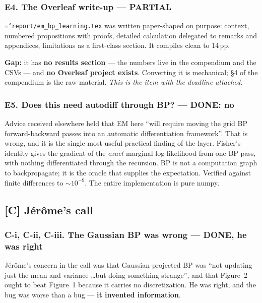 \documentclass[11pt,a4paper]{article}
\newcommand{\done}{\textcolor{GoodGreen}{\textbf{DONE}}}
\newcommand{\partialx}{\textcolor{WarnAmber}{\textbf{PARTIAL}}}
\newcommand{\code}[1]{\texttt{\small\hyphenchar\font=`\-\relax #1}}
\begin{document}
\subsubsection*{E4. The Overleaf write-up --- \partialx}

\code{report/em\_bp\_learning.tex} was written paper-shaped on purpose: context, numbered
propositions with proofs, detailed calculation delegated to remarks and appendices,
limitations as a first-class section. It compiles clean to 14\,pp.

\textbf{Gap:} it has \textbf{no results section} --- the numbers live in the compendium and
the CSVs --- and \textbf{no Overleaf project exists}. Converting it is mechanical; \S4 of
the compendium is the raw material. \emph{This is the item with the deadline attached.}

\subsubsection*{E5. Does this need autodiff through BP? --- \done: no}

Advice received elsewhere held that EM here ``will require moving the grid BP
forward-backward passes into an automatic differentiation framework''. That is wrong, and
it is the single most useful practical finding of the layer. Fisher's identity gives the
gradient of the \emph{exact} marginal log-likelihood from one BP pass, with nothing
differentiated through the recursion. BP is not a computation graph to backpropagate; it is
the oracle that supplies the expectation. Verified against finite differences to
$\sim 10^{-9}$. The entire implementation is pure numpy.

\subsection{[C] J\'er\^ome's call}

\subsubsection*{C-i, C-ii, C-iii. The Gaussian BP was wrong --- \done, he was right}

J\'er\^ome's concern in the call was that Gaussian-projected BP was ``not updating just the
mean and variance \dots but doing something strange'', and that Figure~2 ought to beat
Figure~1 because it carries no discretization. He was right, and the bug was worse than a
bug --- \textbf{it invented information}.
\end{document}
